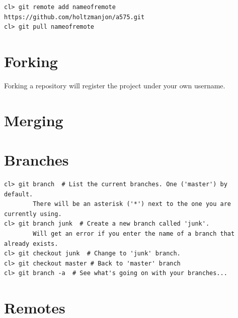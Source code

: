 \documentclass{article}
\begin{document}
\begin{verbatim}
cl> git remote add nameofremote https://github.com/holtzmanjon/a575.git
cl> git pull nameofremote
\end{verbatim}

\section{Forking}
Forking a repository will register the project under your own username.

\section{Merging}

\section{Branches}
\begin{verbatim}
cl> git branch  # List the current branches. One ('master') by default.
        There will be an asterisk ('*') next to the one you are currently using.
cl> git branch junk  # Create a new branch called 'junk'.
        Will get an error if you enter the name of a branch that already exists.
cl> git checkout junk  # Change to 'junk' branch.
cl> git checkout master # Back to 'master' branch
cl> git branch -a  # See what's going on with your branches...
\end{verbatim}

\section{Remotes}
\end{document}
